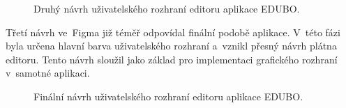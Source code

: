 \documentclass[male,czech,api_bc]{kitheses}
\begin{document}
\begin{figure}[H]
	\centering
	\caption{Druhý návrh uživatelského rozhraní editoru aplikace EDUBO.}
	\label{fig:edubo-navrh-2}
\end{figure}

Třetí návrh ve~Figma již téměř odpovídal finální podobě aplikace. V~této fázi byla určena hlavní barva uživatelského rozhraní a~vznikl přesný návrh plátna editoru. Tento návrh sloužil jako základ pro implementaci grafického rozhraní v~samotné aplikaci.

\begin{figure}[H]
	\centering
	\caption{Finální návrh uživatelského rozhraní editoru aplikace EDUBO.}
	\label{fig:edubo-navrh-3}
\end{figure}
\end{document}
